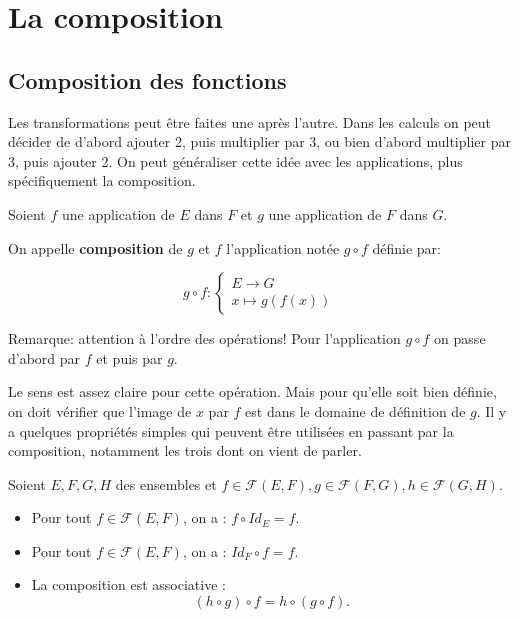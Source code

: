 \documentclass{article}
\begin{document}
\section{La composition}
\subsection{Composition des fonctions}
Les transformations peut être faites une après l'autre. Dans les calculs on peut décider de d'abord ajouter 2, puis multiplier par 3, ou bien d'abord multiplier par 3, puis ajouter 2. On peut généraliser cette idée avec les applications, plus spécifiquement la composition.

\begin{tcolorbox}[colback=red!5!white,colframe=red!75!black,title=Définition 3.6]

Soient $f$ une application de $E$ dans $F$ et $g$ une application de $F$ dans $G$.

On appelle \textbf{composition} de $g$ et $f$ l'application notée $g \circ f$ définie par:

\[ g \circ f :
\begin{cases}
E \to G \\ 
x \mapsto g(f(x))
\end{cases}
\]

\end{tcolorbox}

Remarque: attention à l'ordre des opérations! Pour l'application $g \circ f$ on passe d'abord par $f$ et puis par $g$.

Le sens est assez claire pour cette opération. Mais pour qu'elle soit bien définie, on doit vérifier que l'image de $x$ par $f$ est dans le domaine de définition de $g$. Il y a quelques propriétés simples qui peuvent être utilisées en passant par la composition, notamment les trois dont on vient de parler.

\begin{tcolorbox}[colback=blue!5!white,colframe=blue!75!black,title=Propriété 3.1]

Soient $E, F, G, H$ des ensembles et $f \in \mathcal{F}(E,F), g \in \mathcal{F}(F,G), h \in \mathcal{F}(G,H)$.
\begin{itemize}
    \item Pour tout $f \in \mathcal{F}(E,F)$, on a : $f \circ Id_E = f$.
    \item Pour tout $f \in \mathcal{F}(E,F)$, on a : $Id_F \circ f = f$.
    \item La composition est associative : 
    \[
    (h \circ g) \circ f = h \circ (g \circ f).
    \]
\end{itemize}

\end{tcolorbox} 
\end{document}
